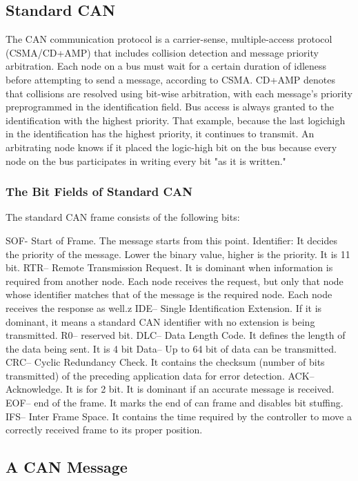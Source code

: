 \subsection{Standard CAN }

The CAN communication protocol is a carrier-sense, multiple-access protocol (CSMA/CD+AMP) that includes collision detection and message priority arbitration. Each node on a bus must wait for a certain duration of idleness before attempting to send a message, according to CSMA. CD+AMP denotes that collisions are resolved using bit-wise arbitration, with each message's priority preprogrammed in the identification field. Bus access is always granted to the identification with the highest priority. That example, because the last logichigh in the identification has the highest priority, it continues to transmit. An arbitrating node knows if it placed the logic-high bit on the bus because every node on the bus participates in writing every bit "as it is written."

\subsubsection{The Bit Fields of Standard CAN}

The standard CAN frame consists of the following bits:

SOF- Start of Frame. The message starts from this point.
Identifier: It decides the priority of the message. Lower the binary value, higher is the priority. It is 11 bit.
RTR– Remote Transmission Request. It is dominant when information is required from another node. Each node receives the request, but only that node whose identifier matches that of the message is the required node. Each node receives the response as well.z
IDE– Single Identification Extension. If it is dominant, it means a standard CAN identifier with no extension is being transmitted.
R0– reserved bit.
DLC– Data Length Code. It defines the length of the data being sent. It is 4 bit
Data– Up to 64 bit of data can be transmitted.
CRC– Cyclic Redundancy Check. It contains the checksum (number of bits transmitted) of the preceding application data for error detection.
ACK– Acknowledge. It is for 2 bit. It is dominant if an accurate message is received.
EOF– end of the frame. It marks the end of can frame and disables bit stuffing.
IFS– Inter Frame Space. It contains the time required by the controller to move a correctly received frame to its proper position.


\subsection{A CAN Message }
